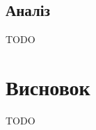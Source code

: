 \documentclass[14pt,a4paper]{extarticle}
\newcounter{e}
\numberwithin{equation}{section}
\numberwithin{figure}{section}
\begin{document}
	\subsection{Аналіз}
	TODO
	
	\newpage
	\thispagestyle{empty}
	\section{Висновок}
	TODO
	
	\newpage
	\thispagestyle{empty}
	
	\nocite{ongie2020deep}
		
	\nocite{Adler_2017}
	\printbibliography[title={Бібліографія}]
\end{document}

